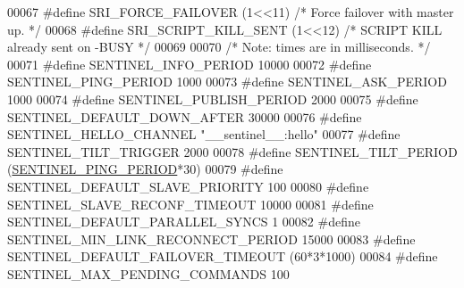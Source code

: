 \begin{DoxyCode}
00067 \textcolor{preprocessor}{#}\textcolor{preprocessor}{define} \textcolor{preprocessor}{SRI\_FORCE\_FAILOVER} \textcolor{preprocessor}{(}1\textcolor{preprocessor}{<<}11\textcolor{preprocessor}{)}  \textcolor{comment}{/* Force failover with master up. */}
00068 \textcolor{preprocessor}{#}\textcolor{preprocessor}{define} \textcolor{preprocessor}{SRI\_SCRIPT\_KILL\_SENT} \textcolor{preprocessor}{(}1\textcolor{preprocessor}{<<}12\textcolor{preprocessor}{)} \textcolor{comment}{/* SCRIPT KILL already sent on -BUSY */}
00069 
00070 \textcolor{comment}{/* Note: times are in milliseconds. */}
00071 \textcolor{preprocessor}{#}\textcolor{preprocessor}{define} \textcolor{preprocessor}{SENTINEL\_INFO\_PERIOD} 10000
00072 \textcolor{preprocessor}{#}\textcolor{preprocessor}{define} \textcolor{preprocessor}{SENTINEL\_PING\_PERIOD} 1000
00073 \textcolor{preprocessor}{#}\textcolor{preprocessor}{define} \textcolor{preprocessor}{SENTINEL\_ASK\_PERIOD} 1000
00074 \textcolor{preprocessor}{#}\textcolor{preprocessor}{define} \textcolor{preprocessor}{SENTINEL\_PUBLISH\_PERIOD} 2000
00075 \textcolor{preprocessor}{#}\textcolor{preprocessor}{define} \textcolor{preprocessor}{SENTINEL\_DEFAULT\_DOWN\_AFTER} 30000
00076 \textcolor{preprocessor}{#}\textcolor{preprocessor}{define} \textcolor{preprocessor}{SENTINEL\_HELLO\_CHANNEL} \textcolor{stringliteral}{"\_\_sentinel\_\_:hello"}
00077 \textcolor{preprocessor}{#}\textcolor{preprocessor}{define} \textcolor{preprocessor}{SENTINEL\_TILT\_TRIGGER} 2000
00078 \textcolor{preprocessor}{#}\textcolor{preprocessor}{define} \textcolor{preprocessor}{SENTINEL\_TILT\_PERIOD} \textcolor{preprocessor}{(}\hyperlink{sentinel_8c_a9e22409355fa7a4db7f3a43fbe2d9101}{SENTINEL\_PING\_PERIOD}\textcolor{preprocessor}{*}30\textcolor{preprocessor}{)}
00079 \textcolor{preprocessor}{#}\textcolor{preprocessor}{define} \textcolor{preprocessor}{SENTINEL\_DEFAULT\_SLAVE\_PRIORITY} 100
00080 \textcolor{preprocessor}{#}\textcolor{preprocessor}{define} \textcolor{preprocessor}{SENTINEL\_SLAVE\_RECONF\_TIMEOUT} 10000
00081 \textcolor{preprocessor}{#}\textcolor{preprocessor}{define} \textcolor{preprocessor}{SENTINEL\_DEFAULT\_PARALLEL\_SYNCS} 1
00082 \textcolor{preprocessor}{#}\textcolor{preprocessor}{define} \textcolor{preprocessor}{SENTINEL\_MIN\_LINK\_RECONNECT\_PERIOD} 15000
00083 \textcolor{preprocessor}{#}\textcolor{preprocessor}{define} \textcolor{preprocessor}{SENTINEL\_DEFAULT\_FAILOVER\_TIMEOUT} \textcolor{preprocessor}{(}60\textcolor{preprocessor}{*}3\textcolor{preprocessor}{*}1000\textcolor{preprocessor}{)}
00084 \textcolor{preprocessor}{#}\textcolor{preprocessor}{define} \textcolor{preprocessor}{SENTINEL\_MAX\_PENDING\_COMMANDS} 100

\end{DoxyCode}
